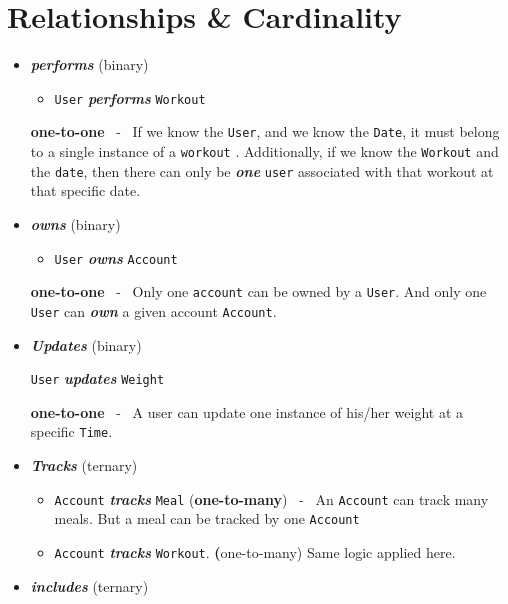 \documentclass{report}
\begin{document}
        \section{Relationships \& Cardinality}
        \begin{itemize}
            \item \textit{\textbf{performs}} (binary)
            \begin{itemize}
            \item \texttt{User} \textit{\textbf{performs}} \texttt{Workout}
            \end{itemize}
            \textbf{one-to-one} \ - \ If we know the \texttt{User}, and we know the \texttt{Date}, it must belong to a single instance of a \texttt{workout} . Additionally, if we know the \texttt{Workout} and the \texttt{date}, then there can only be \textit{\textbf{one}} \texttt{user} associated with that workout at that specific date.
        \item \textit{\textbf{owns}} (binary)
            \begin{itemize}[label=$\circ$]
            \item \texttt{User} \textit{\textbf{owns}} \texttt{Account}
        \end{itemize}
        \textbf{one-to-one} \ - \ Only one \texttt{account} can be owned by a \texttt{User}. And only one \texttt{User} can \textit{\textbf{own}} a given account \texttt{Account}.
        \item \textit{\textbf{Updates}} (binary)
            \begin{itemize}[label=$\circ$]
                \texttt{User}  \textit{\textbf{updates}} \texttt{Weight}
            \end{itemize}
            \textbf{one-to-one} \ - \ A user can update one instance of his/her weight at a specific \texttt{Time}.
        \item \textit{\textbf{Tracks}} (ternary)
            \begin{itemize}[label=$\circ$]
                \item  \texttt{Account} \textit{\textbf{tracks}} \texttt{Meal} (\textbf{one-to-many}) \ - \ An \texttt{Account} can track many meals. But a meal can be tracked by one \texttt{Account}
                \item \texttt{Account} \textit{\textbf{tracks}} \texttt{Workout}. \textbf(one-to-many) Same logic applied here. 
            \end{itemize}
        \item \textit{\textbf{includes}} (ternary)

\end{itemize}
\end{document}
